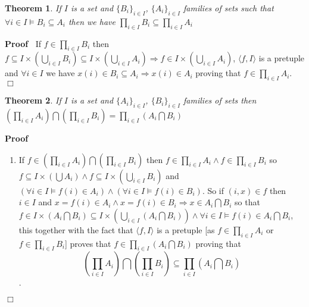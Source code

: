 \documentclass{book}
\newenvironment{proof}{\noindent\textbf{Proof\ }}{\hspace*{\fill}$\Box$\medskip}
\newtheorem{theorem}{Theorem}
\begin{document}
{{\begin{theorem}
  \label{general product of sets and subsets}If $I$ is a set and $\{ B_i \}_{i
  \in I}$, $\{ A_i \}_{i \in I}$ families of sets such that $\forall i \in I
  \vDash B_i \subseteq A_i$ then we have $\prod_{i \in I} B_i \subseteq
  \prod_{i \in I} A_i$
\end{theorem}

\begin{proof}
  If $f \in \prod_{i \in I} B_i$ then $f \subseteq I \times \left( \bigcup_{i
  \in I} B_i \right) \subseteq I \times \left( \bigcup_{i \in I} A_i \right)
  \Rightarrow f \in I \times \left( \bigcup_{i \in I} A_i \right)$, $\langle
  f, I \rangle$ is a pretuple and $\forall i \in I$ we have $x (i) \in B_i
  \subseteq A_i \Rightarrow x (i) \in A_i$ proving that $f \in \prod_{i \in I}
  A_i$. 
\end{proof}

\begin{theorem}
  \label{intersection of general product of sets}If $I$ is a set and $\{ A_i
  \}_{i \in I}$, $\{ B_i \}_{i \in I}$ families of sets then $\left( \prod_{i
  \in I} A_i \right) \bigcap \left( \prod_{i \in I} B_i \right) = \prod_{i \in
  I} \left( A_i \bigcap B_i \right)$
\end{theorem}

\begin{proof}
  
  \begin{enumerate}
    \item If $f \in \left( \prod_{i \in I} A_i \right) \bigcap \left( \prod_{i
    \in I} B_i \right)$ then $f \in \prod_{i \in I} A_i \wedge f \in \prod_{i
    \in I} B_i$ so $f \subseteq I \times \left( \bigcup A_i \right) \wedge f
    \subseteq I \times \left( \bigcup_{i \in I} B_i \right)$ and $(\forall i
    \in I \vDash f (i) \in A_i) \wedge (\forall i \in I \vDash f (i) \in
    B_i)$. So if $(i, x) \in f$ then $i \in I$ and $x = f (i) \in A_i \wedge x
    = f (i) \in B_i \Rightarrow x \in A_i \bigcap B_i$ so that $f \in I \times
    \left( A_i \bigcap B_i \right) \subseteq I \times \left( \bigcup_{i \in I}
    \left( A_i \bigcap B_i \right) \right) \wedge \forall i \in I \vDash f (i)
    \in A_i \bigcap B_i$, this together with the fact that $\langle f, I
    \rangle$ is a pretuple [as $f \in \prod_{i \in I} A_i$ or $f \in \prod_{i
    \in I} B_i$] proves that $f \in \prod_{i \in I} \left( A_i \bigcap B_i
    \right)$ proving that \
    \begin{equation}
      \label{eq 2.1} \left( \prod_{i \in I} A_i \right) \bigcap \left(
      \prod_{i \in I} B_i \right) \subseteq \prod_{i \in I} \left( A_i \bigcap
      B_i \right)
    \end{equation}
    .
    

\end{enumerate}
\end{proof}}}
\end{document}
